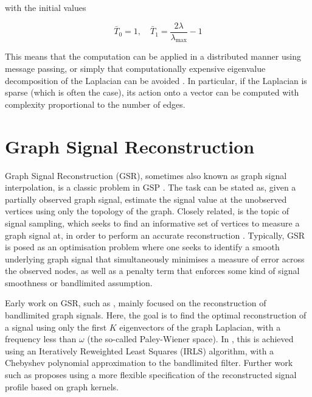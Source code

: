 with the initial values

\begin{equation}
    \bar{T}_0 = 1, \quad \bar{T}_1 = \frac{2 \lambda }{\lambda_{\text{max}}} - 1
\end{equation}

This means that the computation can be applied in a distributed manner using message passing, or simply that computationally expensive eigenvalue decomposition of the Laplacian can be avoided \citep{Shuman2018}. In particular, if the Laplacian is sparse (which is often the case), its action onto a vector can be computed with complexity proportional to the number of edges. 


\section{Graph Signal Reconstruction}

Graph Signal Reconstruction (GSR), sometimes also known as graph signal interpolation, is a classic problem in GSP \citep{Ortega2018}. The task can be stated as, given a partially observed graph signal, estimate the signal value at the unobserved vertices using only the topology of the graph. Closely related, is the topic of signal sampling, which seeks to find an informative set of vertices to measure a graph signal at, in order to perform an accurate reconstruction \citep{Tanaka2020}. Typically, GSR is posed as an optimisation problem where one seeks to identify a smooth underlying graph signal that simultaneously minimises a measure of error across the observed nodes, as well as a penalty term that enforces some kind of signal smoothness or bandlimited assumption. 

Early work on GSR, such as \cite{Narang2013b,Narang2013,Wang2015b,Anis2016}, mainly focused on the reconstruction of bandlimited graph signals. Here, the goal is to find the optimal reconstruction of a signal using only the first $K$ eigenvectors of the graph Laplacian, with a frequency less than $\omega$ (the so-called Paley-Wiener space). In \cite{Narang2013b}, this is achieved using an Iteratively Reweighted Least Squares (IRLS) algorithm, with a Chebyshev polynomial approximation to the bandlimited filter. Further work such as \citep{Romero2017b} proposes using a more flexible specification of the reconstructed signal profile based on graph kernels. 

